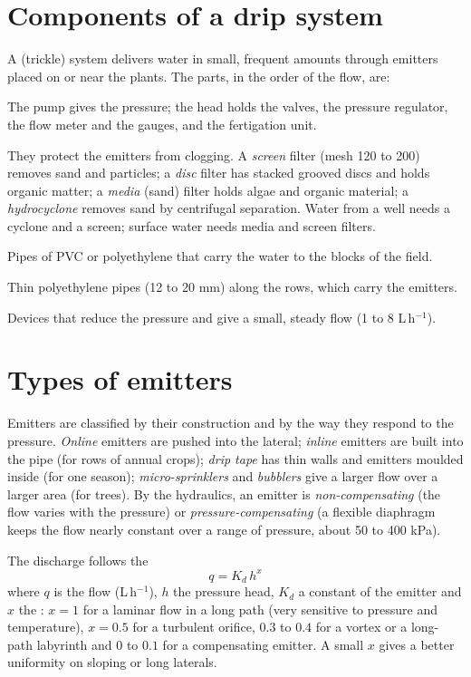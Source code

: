 \section{Components of a drip system}
A  (trickle) system delivers water in small, frequent amounts through emitters placed on or near the plants. The parts, in the order of the flow, are:
\begin{exlist}
\item {} The pump gives the pressure; the head holds the valves, the pressure regulator, the flow meter and the gauges, and the fertigation unit.
\item {} They protect the emitters from clogging. A \emph{screen} filter (mesh 120 to 200) removes sand and particles; a \emph{disc} filter has stacked grooved discs and holds organic matter; a \emph{media} (sand) filter holds algae and organic material; a \emph{hydrocyclone} removes sand by centrifugal separation. Water from a well needs a cyclone and a screen; surface water needs media and screen filters.
\item {} Pipes of PVC or polyethylene that carry the water to the blocks of the field.
\item {} Thin polyethylene pipes (12 to 20 mm) along the rows, which carry the emitters.
\item {} Devices that reduce the pressure and give a small, steady flow (1 to 8 L\,h$^{-1}$).
\end{exlist}

\section{Types of emitters}
Emitters are classified by their construction and by the way they respond to the pressure. \emph{Online} emitters are pushed into the lateral; \emph{inline} emitters are built into the pipe (for rows of annual crops); \emph{drip tape} has thin walls and emitters moulded inside (for one season); \emph{micro-sprinklers} and \emph{bubblers} give a larger flow over a larger area (for trees). By the hydraulics, an emitter is \emph{non-compensating} (the flow varies with the pressure) or \emph{pressure-compensating} (a flexible diaphragm keeps the flow nearly constant over a range of pressure, about 50 to 400 kPa).
\par\noindent The discharge follows the 
\begin{equation*}\boxed{q=K_d\,h^{x}}\end{equation*}
where $q$ is the flow (L\,h$^{-1}$), $h$ the pressure head, $K_d$ a constant of the emitter and $x$ the : $x=1$ for a laminar flow in a long path (very sensitive to pressure and temperature), $x=0.5$ for a turbulent orifice, $0.3$ to $0.4$ for a vortex or a long-path labyrinth and $0$ to $0.1$ for a compensating emitter. A small $x$ gives a better uniformity on sloping or long laterals.

